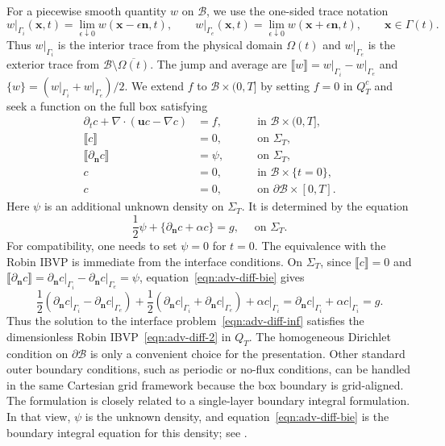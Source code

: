 \documentclass[11pt,reqno]{amsart}
\theoremstyle{plain}
\theoremstyle{definition}
\numberwithin{equation}{section}
\newcommand{\paren}[1]{\left(#1\right)}
\newcommand{\jump}[1]{\llbracket#1\rrbracket}
\newcommand{\p}{\partial}
\newcommand{\at}[2]{\left. #1 \right|_{#2}}
\newcommand{\grad}[1]{\nabla #1}
\newcommand{\mc}[1]{\mathcal{#1}}
\newcommand{\bm}[1]{\boldsymbol{#1}}
\begin{document}
For a piecewise smooth quantity $w$ on $\mc B$, we use the one-sided trace
notation
\begin{equation}
  \at{w}{\Gamma_i}(\bm x,t)
  = \lim_{\epsilon\downarrow0} w(\bm x-\epsilon\bm n,t),
  \qquad
  \at{w}{\Gamma_e}(\bm x,t)
  = \lim_{\epsilon\downarrow0} w(\bm x+\epsilon\bm n,t),
  \qquad \bm x\in\Gamma(t).
\end{equation}
Thus $\at{w}{\Gamma_i}$ is the
interior trace from the physical domain $\Omega(t)$ and $\at{w}{\Gamma_e}$ is
the exterior trace from $\mc B\setminus\overline{\Omega(t)}$. The jump and
average are $\jump{w}=\at{w}{\Gamma_i}-\at{w}{\Gamma_e}$ and
$\{w\}=(\at{w}{\Gamma_i}+\at{w}{\Gamma_e})/2$.
We extend $f$ to $\mc B\times(0,T]$ by setting $f=0$ in $Q_T^c$ and seek a
function on the full box satisfying
\begin{equation}\label{eqn:adv-diff-inf}
\begin{aligned}
    \partial_t c + \grad\cdot(\bm u c - \grad c) &=  f, \quad&&\text{ in }\mc B\times (0,T], \\
    \jump{c} &= 0, \quad&&\text{ on }\Sigma_T,\\
    \jump{\partial_{\bm n} c} &= \psi, \quad&&\text{ on }\Sigma_T,\\
    c &= 0, \quad&& \text{ in }\mc B \times\{t=0\}, \\
    c &= 0, \quad && \text{ on }\partial\mc B\times[0,T].
\end{aligned}
\end{equation}
Here $\psi$ is an additional unknown density on $\Sigma_T$. It is determined by the equation
\begin{equation}\label{eqn:adv-diff-bie}
     \frac{1}{2}\psi +\{\p_{\bm n}c + \alpha c\} = g, \quad\text{ on }\Sigma_T.
\end{equation}
For compatibility, one needs to set $\psi = 0$ for $t=0$.
The equivalence with the Robin IBVP is immediate from the interface conditions. On $\Sigma_T$, since $\jump{c}=0$ and $\jump{\partial_{\bm n}c}=\at{\partial_{\bm n}c}{\Gamma_i}
-\at{\partial_{\bm n}c}{\Gamma_e}=\psi$, equation~\eqref{eqn:adv-diff-bie} gives
\begin{equation}
\frac12\paren{\at{\partial_{\bm n}c}{\Gamma_i}
-\at{\partial_{\bm n}c}{\Gamma_e}}
+\frac12\paren{\at{\partial_{\bm n}c}{\Gamma_i}
+\at{\partial_{\bm n}c}{\Gamma_e}}
+\alpha\at{c}{\Gamma_i}
=\at{\partial_{\bm n}c}{\Gamma_i}+\alpha\at{c}{\Gamma_i}=g.
\end{equation}
Thus the solution to the interface problem~\eqref{eqn:adv-diff-inf} satisfies
the dimensionless Robin IBVP~\eqref{eqn:adv-diff-2} in $Q_T$.
The homogeneous Dirichlet condition on $\partial\mc B$ is only a convenient
choice for the presentation. Other standard outer boundary conditions, such as
periodic or no-flux conditions, can be handled in the same Cartesian
grid framework because the box boundary is grid-aligned.
The formulation is closely related to a single-layer boundary integral formulation. In that view, $\psi$ is the unknown density, and equation~\eqref{eqn:adv-diff-bie} is the boundary integral equation for this density; see \cite{Costabel1990}.
\end{document}
